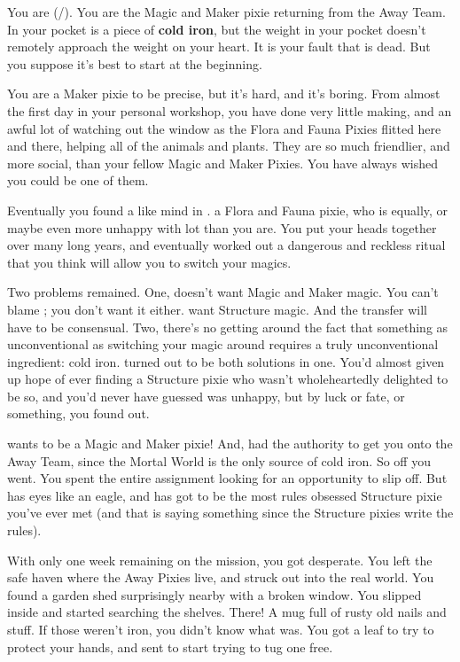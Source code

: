 \documentclass[char]{PP}
\begin{document}
\name{\cMChange{}}

You are \cMChange{} (\cMChange{\They}/\cMChange{\Them}). You are the Magic and Maker pixie returning from the Away Team. In your pocket is a piece of \textbf{cold iron}, but the weight in your pocket doesn’t remotely approach the weight on your heart. It is your fault that \cFLost{} is dead. But you suppose it’s best to start at the beginning.

You are a Maker pixie to be precise, but it’s hard, and it’s boring. From almost the first day in your personal workshop, you have done very little making, and an awful lot of watching out the window as the Flora and Fauna Pixies flitted here and there, helping all of the animals and plants. They are so much friendlier, and more social, than your fellow Magic and Maker Pixies. You have always wished you could be one of them.

Eventually you found a like mind in \cFWanabe{}. \cFWanabe{\They} \cFWanabe{\are} a Flora and Fauna pixie, who is equally, or maybe even more unhappy with \cFWanabe{\their} lot than you are. You put your heads together over many long years, and eventually worked out a dangerous and reckless ritual that you think will allow you to switch your magics.

Two problems remained. One, \cFWanabe{} doesn’t want Magic and Maker magic. You can’t blame \cFWanabe{\them}; you don’t want it either. \cFWanabe{\They} want Structure magic. And the transfer will have to be consensual. Two, there’s no getting around the fact that something as unconventional as switching your magic around requires a truly unconventional ingredient: cold iron. \cSAdvisor{} turned out to be both solutions in one. You’d almost given up hope of ever finding a Structure pixie who wasn't wholeheartedly delighted to be so, and you’d never have guessed \cSAdvisor{} was unhappy, but by luck or fate, or something, you found out.

\cSAdvisor{} wants to be a Magic and Maker pixie! And, \cSAdvisor{\they} had the authority to get you onto the Away Team, since the Mortal World is the only source of cold iron. So off you went. You spent the entire assignment looking for an opportunity to slip off. But \cSPM{} has eyes like an eagle, and has got to be the most rules obsessed Structure pixie you’ve ever met (and that is saying something since the Structure pixies write the rules).

With only one week remaining on the mission, you got desperate. You left the safe haven where the Away Pixies live, and struck out into the real world. You found a garden shed surprisingly nearby with a broken window. You slipped inside and started searching the shelves. There! A mug full of rusty old nails and stuff. If those weren’t iron, you didn’t know what was. You got a leaf to try to protect your hands, and sent to start trying to tug one free.
\end{document}
